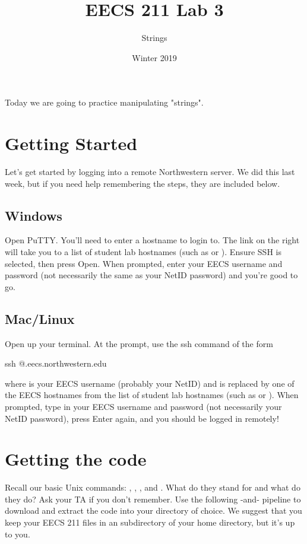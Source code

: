 \documentclass{tufte-handout}
\title{EECS 211 Lab 3}
\author{Strings}
\date{Winter 2019}
\begin{document}
\maketitle

Today we are going to practice manipulating "strings".

\section{Getting Started}
Let's get started by logging into a remote Northwestern server. We did this last week, but if you need help remembering the steps, they are included below.

\subsection{Windows}
Open PuTTY. You'll need to enter a hostname to login to. The link on the right will take you to a list of student lab hostnames (such as   or ).  Ensure SSH is selected, then press Open. When prompted, enter your EECS username and password (not necessarily the same as your NetID password) and you're good to go.

\subsection{Mac/Linux}
Open up your terminal. At the prompt, use the ssh command of the form
\begin{CmdLine}
  \prompt ssh @.eecs.northwestern.edu
\end{CmdLine}
\noindent where  is your EECS username (probably your NetID)
and  is replaced by one of the EECS hostnames from the list
of student lab hostnames (such as  or
).
When prompted, type in your EECS username and password (not necessarily your NetID password), press
Enter again, and you should be logged in remotely!

\section{Getting the code} Recall our basic Unix commands:
, , , and . What
do they stand for and what do they do? Ask your TA if you don't
remember. Use the following
-and- pipeline to download and extract the
code into your directory of choice. We suggest that you keep your EECS
211 files in an  subdirectory of your home directory,
but it's up to you.
\end{document}
